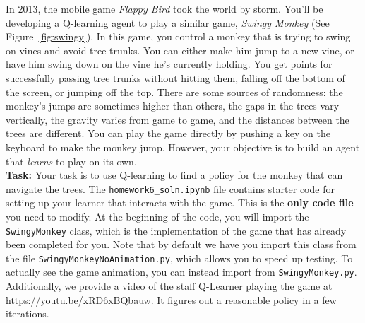 \documentclass[submit]{harvardml}
\begin{document}
\newpage





\begin{problem}
    In 2013, the mobile game \emph{Flappy Bird} took the world by storm. You'll be developing a Q-learning agent to play a similar game, \emph{Swingy Monkey} (See Figure~\ref{fig:swingy}).  In this game, you control a monkey that is trying to swing on vines and avoid tree trunks.  You can either make him jump to a new vine, or have him swing down on the vine he's currently holding.  You get points for successfully passing tree trunks without hitting them, falling off the bottom of the screen, or jumping off the top.  There are some sources of randomness: the monkey's jumps are sometimes higher than others, the gaps in the trees vary vertically, the gravity varies from game to game, and the distances between the trees are different.  You can play the game directly by pushing a key on the keyboard to make the monkey jump.  However, your objective is to build an agent that \emph{learns} to play on its own. %
    \\
  
    \noindent \textbf{Task:} Your task is to use Q-learning to find a policy for the monkey that can navigate the trees.  The \verb|homework6_soln.ipynb| file contains starter code for setting up your learner that interacts with the game. This is the \textbf{only code file} you need to modify. At the beginning of the code, you will import the \verb|SwingyMonkey| class, which is the implementation of the game that has already been completed for you. Note that by default we have you import this class from the file \verb|SwingyMonkeyNoAnimation.py|, which allows you to speed up testing. To actually see the game animation, you can instead import from \verb|SwingyMonkey.py|. Additionally, we provide a video of the staff Q-Learner playing the game at \url{https://youtu.be/xRD6xBQbauw}. It figures out a reasonable policy in a few iterations. 
    

\end{problem}
\end{document}
